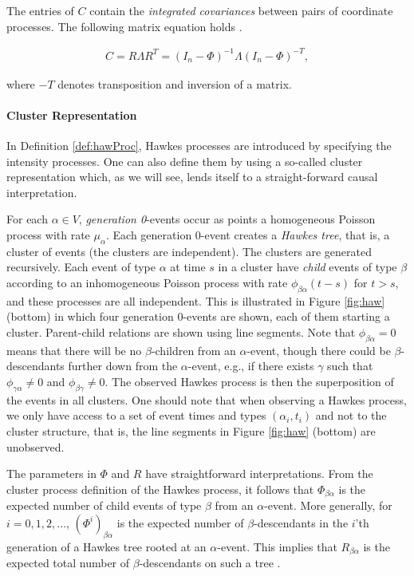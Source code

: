 \documentclass[accepted]{uai2021} %
\begin{document}
The entries of $C$ contain the \emph{integrated covariances} between pairs of 
coordinate processes. The following matrix equation holds 
\citep{jovanovic2015,	 
achab2017}.


\begin{align}
	C = R \Lambda R^T = (I_n - \Phi)^{-1}\Lambda(I_n - \Phi)^{-T},
	\label{eq:covarEq}
\end{align}


where $-T$ denotes transposition and 
inversion of a matrix.


\paragraph{Cluster Representation}

In Definition \ref{def:hawProc}, Hawkes processes are introduced by specifying 
the intensity processes. One can also define them by using a so-called cluster 
representation which, as we will see, lends itself to a straight-forward causal 
interpretation.

For each $\alpha\in V$, \emph{generation 0}-events occur as points a 
homogeneous Poisson process with rate $\mu_\alpha$. Each generation 0-event 
creates a \emph{Hawkes tree}, that is, a cluster of events (the clusters are 
independent). The clusters are generated recursively. Each event of type 
$\alpha$ at time $s$ in a cluster have \emph{child} events of type $\beta$ 
according 
to an inhomogeneous Poisson process with rate $\phi_{\beta\alpha}(t-s)$ for $t 
> s$, and these processes are all independent. This is illustrated in Figure 
\ref{fig:haw} (bottom) in which four 
generation 0-events are shown, each of them starting a cluster. Parent-child 
relations are shown using line segments. Note that 
$\phi_{\beta\alpha} = 0$ means that there will be no $\beta$-children from an 
$\alpha$-event, though there could be $\beta$-descendants further down from the 
$\alpha$-event, e.g., if 
there exists $\gamma$ such that $\phi_{\gamma\alpha} \neq 0$ and 
$\phi_{\beta\gamma} \neq 0$. The observed Hawkes process is then the 
superposition of the events in all clusters. One should note that when 
observing a Hawkes process, we only have access to a set of event times and 
types
$(\alpha_i, t_i)$ and not to the cluster structure, that is, the line segments 
in Figure \ref{fig:haw} (bottom) are unobserved.

The parameters in $\Phi$ and $R$ have straightforward interpretations. From the 
cluster process definition of the Hawkes process, it follows that 
$\Phi_{\beta\alpha}$ is the 
expected number of child events of type $\beta$ from an 
$\alpha$-event. More generally, for $i = 0,1,2,\ldots$, 
$(\Phi^i)_{\beta\alpha}$ is the 
expected number of $\beta$-descendants in the $i$'th generation of a Hawkes 
tree rooted at an 
$\alpha$-event. This implies that $R_{\beta\alpha}$ is the expected total 
number of $\beta$-descendants on such a tree
\citep{jovanovic2015}.
\end{document}
